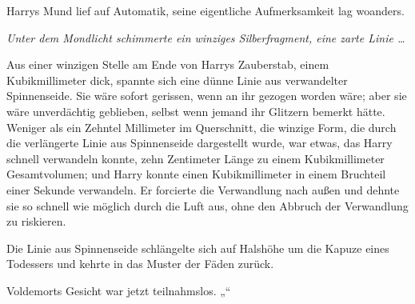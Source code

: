 Harrys Mund lief auf Automatik, seine eigentliche Aufmerksamkeit lag woanders.

\emph{Unter dem Mondlicht schimmerte ein winziges Silberfragment, eine zarte Linie …}

Aus einer winzigen Stelle am Ende von Harrys Zauberstab, einem Kubikmillimeter dick, spannte sich eine dünne Linie aus verwandelter Spinnenseide. Sie wäre sofort gerissen, wenn an ihr gezogen worden wäre; aber sie wäre unverdächtig geblieben, selbst wenn jemand ihr Glitzern bemerkt hätte. Weniger als ein Zehntel Millimeter im Querschnitt, die winzige Form, die durch die verlängerte Linie aus Spinnenseide dargestellt wurde, war etwas, das Harry schnell verwandeln konnte, zehn Zentimeter Länge zu einem Kubikmillimeter Gesamtvolumen; und Harry konnte einen Kubikmillimeter in einem Bruchteil einer Sekunde verwandeln. Er forcierte die Verwandlung nach außen und dehnte sie so schnell wie möglich durch die Luft aus, ohne den Abbruch der Verwandlung zu riskieren.

Die Linie aus Spinnenseide schlängelte sich auf Halshöhe um die Kapuze eines Todessers und kehrte in das Muster der Fäden zurück.

Voldemorts Gesicht war jetzt teilnahmslos.
„“

